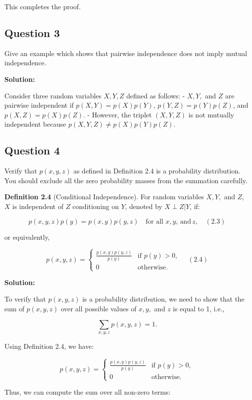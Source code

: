 \documentclass[a4paper,10pt]{article}
\begin{document}
This completes the proof.

\subsection*{Question 3}
Give an example which shows that pairwise independence does not imply mutual independence.

\textbf{Solution:}

Consider three random variables $X, Y, Z$ defined as follows:
- $X, Y,$ and $Z$ are pairwise independent if $p(X, Y) = p(X)p(Y)$, $p(Y, Z) = p(Y)p(Z)$, and $p(X, Z) = p(X)p(Z)$.
- However, the triplet $(X, Y, Z)$ is not mutually independent because $p(X, Y, Z) \neq p(X)p(Y)p(Z)$.

\subsection*{Question 4} Verify that $p(x, y, z)$ as defined in Definition 2.4 is a probability distribution. You should exclude all the zero probability masses from the summation carefully.

\textbf{Definition 2.4} (Conditional Independence). For random variables $X, Y,$ and $Z$, $X$ is independent of $Z$ conditioning on $Y$, denoted by $X \perp Z | Y$, if:

$$
p(x, y, z)p(y) = p(x, y)p(y, z) \quad \text{for all } x, y, \, \text{and} \, z, \quad (2.3)
$$

or equivalently,

$$
p(x, y, z) = 
\begin{cases}
\frac{p(x, y)p(y, z)}{p(y)} & \text{if } p(y) > 0, \\
0 & \text{otherwise}.
\end{cases} \quad (2.4)
$$

\textbf{Solution:}

To verify that $p(x, y, z)$ is a probability distribution, we need to show that the sum of $p(x, y, z)$ over all possible values of $x, y,$ and $z$ is equal to 1, i.e.,

$$
\sum_{x, y, z} p(x, y, z) = 1.
$$

Using Definition 2.4, we have:

$$
p(x, y, z) = 
\begin{cases}
\frac{p(x, y)p(y, z)}{p(y)} & \text{if } p(y) > 0, \\
0 & \text{otherwise}.
\end{cases}
$$

Thus, we can compute the sum over all non-zero terms:
\end{document}
